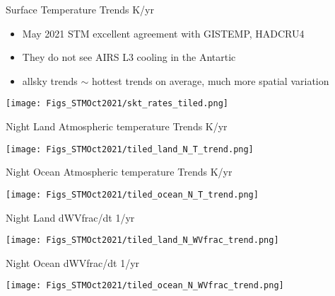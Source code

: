 \documentclass[10pt,t]{beamer}
\begin{document}
\begin{frame}{Surface Temperature Trends K/yr}
\begin{footnotesize}
\begin{itemize}
\item May 2021 STM excellent agreement with GISTEMP, HADCRU4
\item They do not see AIRS L3 cooling in the Antartic
\item allsky trends $\sim$ hottest trends on average, much more spatial variation
\end{itemize}
\end{footnotesize}
\begin{center}
\texttt{[image: Figs\_STMOct2021/skt\_rates\_tiled.png]}
\end{center}
\end{frame}

\begin{frame}{Night Land Atmospheric temperature Trends K/yr}
\begin{center}
\texttt{[image: Figs\_STMOct2021/tiled\_land\_N\_T\_trend.png]}
\end{center}
\end{frame}

\begin{frame}{Night Ocean Atmospheric temperature Trends K/yr}
\begin{center}
\texttt{[image: Figs\_STMOct2021/tiled\_ocean\_N\_T\_trend.png]}
\end{center}
\end{frame}




\begin{frame}{Night Land dWVfrac/dt 1/yr}
\begin{center}
\texttt{[image: Figs\_STMOct2021/tiled\_land\_N\_WVfrac\_trend.png]}
\end{center}
\end{frame}

\begin{frame}{Night Ocean dWVfrac/dt 1/yr}
\begin{center}
\texttt{[image: Figs\_STMOct2021/tiled\_ocean\_N\_WVfrac\_trend.png]}
\end{center}
\end{frame}
\end{document}
